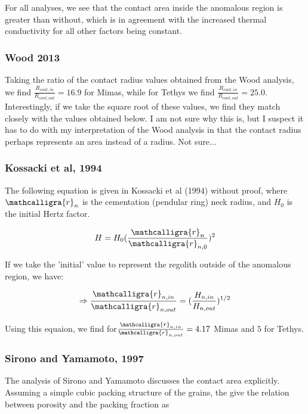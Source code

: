 \documentclass[11pt]{article} %
\newcommand{\sr}{\ensuremath{\mathcalligra{r}} \xspace}
\begin{document}
	For all analyses, we see that the contact area inside the anomalous region is greater than without, which is in agreement with the increased thermal conductivity for all other factors being constant. 

\subsubsection{Wood 2013}

	Taking the ratio of the contact radius values obtained from the Wood analysis, we find $\frac{R_{cont,in}}{R_{cont,out}} = 16.9$ for Mimas, while for Tethys we find $\frac{R_{cont,in}}{R_{cont,out}} = 25.0$. Interestingly, if we take the square root of these values, we find they match closely with the values obtained below. I am not sure why this is, but I suspect it has to do with my interpretation of the Wood analysis in that the contact radius perhaps represents an area instead of a radius. Not sure...

\subsubsection{Kossacki et al, 1994}

	The following equation is given in Kossacki et al (1994) without proof, where $\sr_{n}$ is the cementation (pendular ring) neck radius, and $H_{0}$ is the initial Hertz factor. 
	
	\begin{equation}
	H = H_{0} (\frac{\sr_{n}}{\sr_{n,0}})^{2} \\
	\end{equation}
	
	If we take the 'initial' value to represent the regolith outside of the anomalous region, we have:
	
	\begin{equation}
	\Rightarrow \frac{\sr_{n, in}}{\sr_{n, out}} = (\frac{H_{n, in}}{H_{n, out}})^{1/2}
	\end{equation}
	
	Using this equaion, we find for$\frac{\sr_{n, in}}{\sr_{n, out}} = 4.17$ Mimas and $5$ for Tethys.
	
\subsubsection{Sirono and Yamamoto, 1997}

	The analysis of Sirono and Yamamoto discusses the contact area explicitly. Assuming a simple cubic packing structure of the grains, the give the relation between porosity and the packing fraction as 
	
\end{document}
